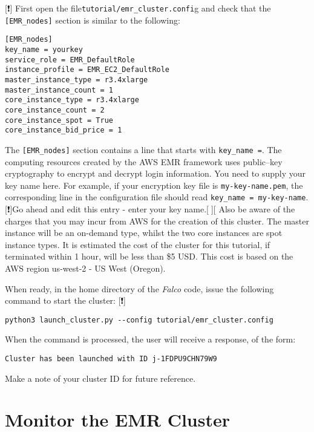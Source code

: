 \documentclass[]{book}
\begin{document}
{[}❗️{]} First open the file\texttt{tutorial/emr\_cluster.confi}g and check that the \texttt{{[}EMR\_nodes{]}} section is similar to the following:

\begin{verbatim}
[EMR_nodes]
key_name = yourkey
service_role = EMR_DefaultRole
instance_profile = EMR_EC2_DefaultRole
master_instance_type = r3.4xlarge
master_instance_count = 1
core_instance_type = r3.4xlarge
core_instance_count = 2
core_instance_spot = True
core_instance_bid_price = 1
\end{verbatim}

The \texttt{{[}EMR\_nodes{]}} section contains a line that starts with \texttt{key\_name\ =}. The computing resources created by the AWS EMR framework uses public--key cryptography to encrypt and decrypt login information. You need to supply your key name here. For example, if your encryption key file is \texttt{my-key-name.pem}, the corresponding line in the configuration file should read \texttt{key\_name\ =\ my-key-name}. {[}❗️{]}Go ahead and edit this entry - enter your key name.{[}🔴{]}{[} Also be aware of the charges that you may incur from AWS for the creation of this cluster. The master instance will be an on-demand type, whilst the two core instances are spot instance types. It is estimated the cost of the cluster for this tutorial, if terminated within 1 hour, will be less than \$5 USD. This cost is based on the AWS region us-west-2 - US West (Oregon).

When ready, in the home directory of the \emph{Falco} code, issue the following command to start the cluster: {[}❗️{]}

\begin{verbatim}
python3 launch_cluster.py --config tutorial/emr_cluster.config
\end{verbatim}

When the command is processed, the user will receive a response, of the form:

\begin{verbatim}
Cluster has been launched with ID j-1FDPU9CHN79W9
\end{verbatim}

Make a note of your cluster ID for future reference.

\hypertarget{monitor-the-emr-cluster}{%
\section{Monitor the EMR Cluster}\label{monitor-the-emr-cluster}}
\end{document}
